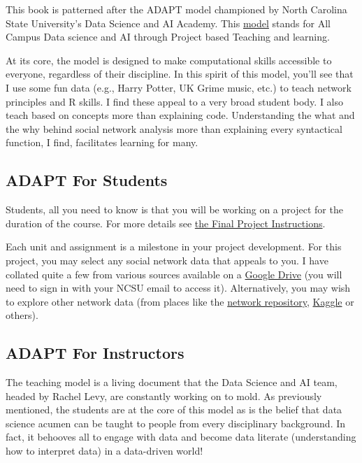 \documentclass[
  letterpaper,
  DIV=11,
  numbers=noendperiod]{scrreprt}
\begin{document}
This book is patterned after the ADAPT model championed by North
Carolina State University's Data Science and AI Academy. This
\href{https://datascienceacademy.ncsu.edu/courses/course-model/}{model}
stands for All Campus Data science and AI through Project based Teaching
and learning.

At its core, the model is designed to make computational skills
accessible to everyone, regardless of their discipline. In this spirit
of this model, you'll see that I use some fun data (e.g., Harry Potter,
UK Grime music, etc.) to teach network principles and R skills. I find
these appeal to a very broad student body. I also teach based on
concepts more than explaining code. Understanding the what and the why
behind social network analysis more than explaining every syntactical
function, I find, facilitates learning for many.

\subsection{ADAPT For Students}\label{adapt-for-students}

Students, all you need to know is that you will be working on a project
for the duration of the course. For more details see
\href{Final\%20Project\%20Instructions.qmd}{the Final Project
Instructions}.

Each unit and assignment is a milestone in your project development. For
this project, you may select any social network data that appeals to
you. I have collated quite a few from various sources available on a
\href{https://drive.google.com/drive/folders/18BRSRSLjBQcbYOiu59cWZ4fzmmK3ZoWJ}{Google
Drive} (you will need to sign in with your NCSU email to access it).
Alternatively, you may wish to explore other network data (from places
like the \href{https://networkrepository.com/index.php}{network
repository}, \href{https://www.kaggle.com/}{Kaggle} or others).

\subsection{ADAPT For Instructors}\label{adapt-for-instructors}

The teaching model is a living document that the Data Science and AI
team, headed by Rachel Levy, are constantly working on to mold. As
previously mentioned, the students are at the core of this model as is
the belief that data science acumen can be taught to people from every
disciplinary background. In fact, it behooves all to engage with data
and become data literate (understanding how to interpret data) in a
data-driven world!
\end{document}
